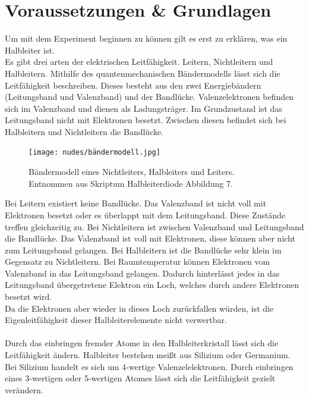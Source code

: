 \documentclass[12pt,a4paper,twoside]{article}
\begin{document}
\section{Voraussetzungen \& Grundlagen} %
Um mit dem Experiment beginnen zu können gilt es erst zu erklären, was ein Halbleiter ist. 
\\
Es gibt drei arten der elektrischen Leitfähigkeit. Leitern, Nichtleitern und Halbleitern. Mithilfe des quantenmechanischen Bändermodells lässt sich die Leitfähigkeit beschreiben. 
Dieses besteht aus den zwei Energiebändern (Leitungsband und Valenzband) und der Bandlücke. Valenzelektronen befinden sich im Valenzband und dienen als Ladungsträger. Im Grundzustand ist das Leitungsband nicht mit Elektronen besetzt. 
Zwischen diesen befindet sich bei Halbleitern und Nichtleitern die Bandlücke. 

\begin{figure}[H]
    \centering
    \texttt{[image: nudes/bändermodell.jpg]}
    \caption{Bändermodell eines Nichtleiters, Halbleiters und Leiters. Entnommen aus Skriptum Halbleiterdiode Abbildung 7. \cite{teachcenter2}}
    \label{fig:Bändermodell}
\end{figure}

\noindent
Bei Leitern existiert keine Bandlücke. Das Valenzband ist nicht voll mit Elektronen besetzt oder es überlappt mit dem Leitungsband. Diese Zustände treffen gleichzeitig zu. 
Bei Nichtleitern ist zwischen Valenzband und Leitungsband die Bandlücke. Das Valenzband ist voll mit Elektronen, diese können aber nicht zum Leitungsband gelangen. 
Bei Halbleitern ist die Bandlücke sehr klein im Gegensatz zu Nichtleitern. Bei Raumtemperatur können Elektronen vom Valenzband in das Leitungsband gelangen. 
Dadurch hinterlässt jedes in das Leitungsband übergetretene Elektron ein Loch, welches durch andere Elektronen besetzt wird. 
\\
Da die Elektronen aber wieder in dieses Loch zurückfallen würden, ist die Eigenleitfähigkeit dieser Halbleiterelemente nicht verwertbar. 
\\
\\
Durch das einbringen fremder Atome in den Halbleiterkristall lässt sich die Leitfähigkeit ändern. Halbleiter bestehen meißt aus Silizium oder Germanium. 
Bei Silizium handelt es sich um 4-wertige Valenzelelektronen. Durch einbringen eines 3-wertigen oder 5-wertigen Atomes lässt sich die Leitfähigkeit gezielt verändern. 
\end{document}
